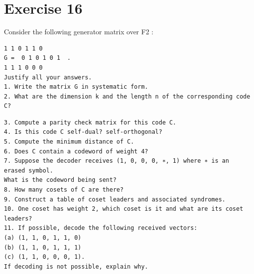 \documentclass[11pt]{article}
\begin{document}
\section*{Exercise 16}
\begin{exercisebox}
Consider the following generator matrix over F2 :

\begin{Verbatim}[fontsize=\small]
1 1 0 1 1 0
G =  0 1 0 1 0 1  .
1 1 1 0 0 0
Justify all your answers.
1. Write the matrix G in systematic form.
2. What are the dimension k and the length n of the corresponding code C?
\end{Verbatim}
\begin{Verbatim}[fontsize=\small]
3. Compute a parity check matrix for this code C.
4. Is this code C self-dual? self-orthogonal?
5. Compute the minimum distance of C.
6. Does C contain a codeword of weight 4?
7. Suppose the decoder receives (1, 0, 0, 0, ∗, 1) where ∗ is an erased symbol.
What is the codeword being sent?
8. How many cosets of C are there?
9. Construct a table of coset leaders and associated syndromes.
10. One coset has weight 2, which coset is it and what are its coset leaders?
11. If possible, decode the following received vectors:
(a) (1, 1, 0, 1, 1, 0)
(b) (1, 1, 0, 1, 1, 1)
(c) (1, 1, 0, 0, 0, 1).
If decoding is not possible, explain why.
\end{Verbatim}
\end{exercisebox}
\end{document}
